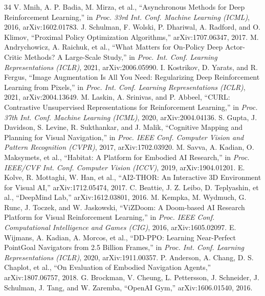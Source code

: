 \documentclass[conference]{IEEEtran}
\begin{document}
\begin{thebibliography}{34}
V. Mnih, A. P. Badia, M. Mirza, et al., ``Asynchronous Methods for Deep Reinforcement Learning,'' in \textit{Proc. 33rd Int. Conf. Machine Learning (ICML)}, 2016, arXiv:1602.01783.
J. Schulman, F. Wolski, P. Dhariwal, A. Radford, and O. Klimov, ``Proximal Policy Optimization Algorithms,'' arXiv:1707.06347, 2017.
M. Andrychowicz, A. Raichuk, et al., ``What Matters for On-Policy Deep Actor-Critic Methods? A Large-Scale Study,'' in \textit{Proc. Int. Conf. Learning Representations (ICLR)}, 2021, arXiv:2006.05990.
I. Kostrikov, D. Yarats, and R. Fergus, ``Image Augmentation Is All You Need: Regularizing Deep Reinforcement Learning from Pixels,'' in \textit{Proc. Int. Conf. Learning Representations (ICLR)}, 2021, arXiv:2004.13649.
M. Laskin, A. Srinivas, and P. Abbeel, ``{CURL}: Contrastive Unsupervised Representations for Reinforcement Learning,'' in \textit{Proc. 37th Int. Conf. Machine Learning (ICML)}, 2020, arXiv:2004.04136.
S. Gupta, J. Davidson, S. Levine, R. Sukthankar, and J. Malik, ``Cognitive Mapping and Planning for Visual Navigation,'' in \textit{Proc. IEEE Conf. Computer Vision and Pattern Recognition (CVPR)}, 2017, arXiv:1702.03920.
M. Savva, A. Kadian, O. Maksymets, et al., ``Habitat: A Platform for Embodied {AI} Research,'' in \textit{Proc. IEEE/CVF Int. Conf. Computer Vision (ICCV)}, 2019, arXiv:1904.01201.
E. Kolve, R. Mottaghi, W. Han, et al., ``{AI2-THOR}: An Interactive {3D} Environment for Visual {AI},'' arXiv:1712.05474, 2017.
C. Beattie, J. Z. Leibo, D. Teplyashin, et al., ``{DeepMind Lab},'' arXiv:1612.03801, 2016.
M. Kempka, M. Wydmuch, G. Runc, J. Toczek, and W. Jaskowski, ``{ViZDoom}: A {Doom}-based {AI} Research Platform for Visual Reinforcement Learning,'' in \textit{Proc. IEEE Conf. Computational Intelligence and Games (CIG)}, 2016, arXiv:1605.02097.
E. Wijmans, A. Kadian, A. Morcos, et al., ``{DD-PPO}: Learning Near-Perfect {PointGoal} Navigators from 2.5 Billion Frames,'' in \textit{Proc. Int. Conf. Learning Representations (ICLR)}, 2020, arXiv:1911.00357.
P. Anderson, A. Chang, D. S. Chaplot, et al., ``On Evaluation of Embodied Navigation Agents,'' arXiv:1807.06757, 2018.
G. Brockman, V. Cheung, L. Pettersson, J. Schneider, J. Schulman, J. Tang, and W. Zaremba, ``{OpenAI Gym},'' arXiv:1606.01540, 2016.

\end{thebibliography}
\end{document}
